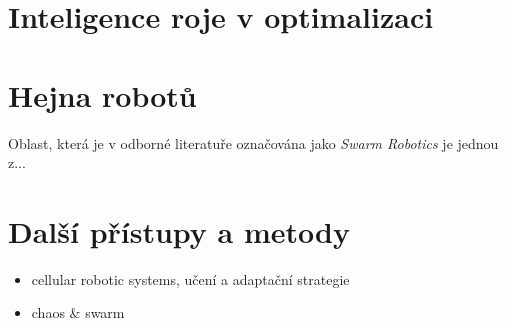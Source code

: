\documentclass[a4paper,12pt]{article}
\let\stdsection\section
\renewcommand\section{\newpage\stdsection}
\begin{document}
\section{Inteligence roje v optimalizaci}




\section{Hejna robotů}
Oblast, která je v odborné literatuře označována jako {\it Swarm Robotics} je jednou z...
\cite{fleischer2005}




\section{Další přístupy a metody}
\begin{itemize}
  \item cellular robotic systems, učení a adaptační strategie
  \item chaos \& swarm
\end{itemize}


%


\end{document}
